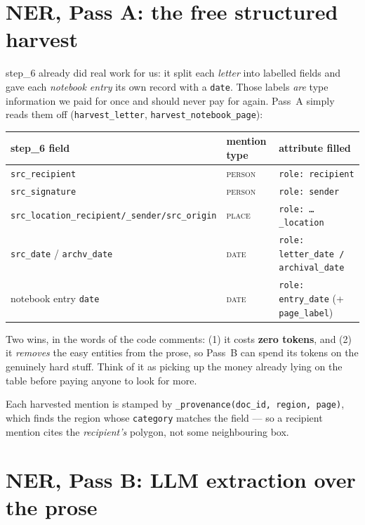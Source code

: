 \documentclass[11pt]{article}
\newcommand{\code}[1]{\texttt{#1}}
\newcommand{\type}[1]{\textsc{#1}}
\begin{document}
\FloatBarrier

\section{NER, Pass A: the free structured harvest}

step\_6 already did real work for us: it split each \emph{letter} into labelled
fields and gave each \emph{notebook entry} its own record with a \code{date}.
Those labels \emph{are} type information we paid for once and should never pay for
again. Pass~A simply reads them off (\code{harvest\_letter}, \code{harvest\_notebook\_page}):

\begin{center}
\small
\begin{tabular}{lll}
\toprule
step\_6 field & mention type & attribute filled \\
\midrule
\code{src\_recipient} & \type{person} & \code{role: recipient} \\
\code{src\_signature} & \type{person} & \code{role: sender} \\
\code{src\_location\_recipient/\_sender/src\_origin} & \type{place} & \code{role: \dots\_location} \\
\code{src\_date} / \code{archv\_date} & \type{date} & \code{role: letter\_date / archival\_date} \\
notebook entry \code{date} & \type{date} & \code{role: entry\_date} (+\,\code{page\_label}) \\
\bottomrule
\end{tabular}
\end{center}

Two wins, in the words of the code comments: (1) it costs \textbf{zero tokens},
and (2) it \emph{removes} the easy entities from the prose, so Pass~B can spend its
tokens on the genuinely hard stuff. Think of it as picking up the money already
lying on the table before paying anyone to look for more.

Each harvested mention is stamped by \code{\_provenance(doc\_id, region, page)},
which finds the region whose \code{category} matches the field --- so a recipient
mention cites the \emph{recipient's} polygon, not some neighbouring box.

\section{NER, Pass B: LLM extraction over the prose}
\end{document}
